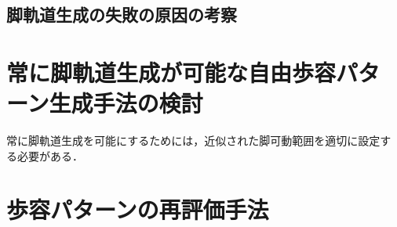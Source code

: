 \subsection{脚軌道生成の失敗の原因の考察}

\section{常に脚軌道生成が可能な自由歩容パターン生成手法の検討}
常に脚軌道生成を可能にするためには，近似された脚可動範囲を適切に設定する必要がある．


\section{歩容パターンの再評価手法}

